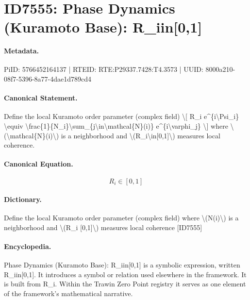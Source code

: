 \section*{ID7555: Phase Dynamics (Kuramoto Base): R\_iin[0,1]}
\paragraph{Metadata.}
PiID: 5766452164137 | RTEID: RTE:P29337.7428:T4.3573 | UUID: 8000a210-08f7-5396-8a77-4dae1d789cd4

\paragraph{Canonical Statement.}
Define the local Kuramoto order parameter (complex field) \textbackslash{}[ R\_i e\textasciicircum{}\{i\textbackslash{}Psi\_i\} \textbackslash{}equiv \textbackslash{}frac\{1\}\{N\_i\}\textbackslash{}sum\_\{j\textbackslash{}in\textbackslash{}mathcal\{N\}(i)\} e\textasciicircum{}\{i\textbackslash{}varphi\_j\} \textbackslash{}] where \textbackslash{}(\textbackslash{}mathcal\{N\}(i)\textbackslash{}) is a neighborhood and \textbackslash{}(R\_i\textbackslash{}in[0,1]\textbackslash{}) measures local coherence.

\paragraph{Canonical Equation.}
\[
R_i\in[0,1]
\]

\paragraph{Dictionary.}
Define the local Kuramoto order parameter (complex field) where \textbackslash{}(N(i)\textbackslash{}) is a neighborhood and \textbackslash{}(R\_i [0,1]\textbackslash{}) measures local coherence [ID7555]

\paragraph{Encyclopedia.}
Phase Dynamics (Kuramoto Base): R\_iin[0,1] is a symbolic expression, written R\_iin[0,1]. It introduces a symbol or relation used elsewhere in the framework. It is built from R\_i. Within the Trawin Zero Point registry it serves as one element of the framework's mathematical narrative.
